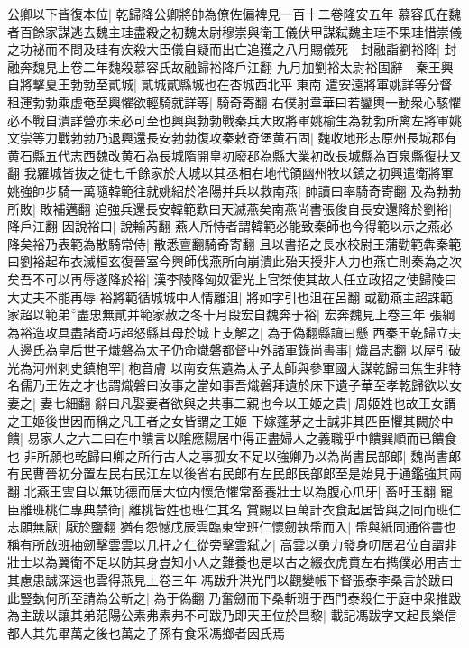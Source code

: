 公卿以下皆復本位|{
	乾歸降公卿將帥為僚佐偏裨見一百十二卷隆安五年}
慕容氏在魏者百餘家謀逃去魏主珪盡殺之初魏太尉穆崇與衛王儀伏甲謀弑魏主珪不果珪惜崇儀之功袐而不問及珪有疾殺大臣儀自疑而出亡追獲之八月賜儀死　封融詣劉裕降|{
	封融奔魏見上卷二年魏殺慕容氏故融歸裕降戶江翻}
九月加劉裕太尉裕固辭　秦王興自將擊夏王勃勃至貳城|{
	貳城貳縣城也在杏城西北平東南}
遣安遠將軍姚詳等分督租運勃勃乘虚奄至興懼欲輕騎就詳等|{
	騎奇寄翻}
右僕射韋華曰若鑾輿一動衆心駭懼必不戰自潰詳營亦未必可至也興與勃勃戰秦兵大敗將軍姚榆生為勃勃所禽左將軍姚文崇等力戰勃勃乃退興還長安勃勃復攻秦敕奇堡黄石固|{
	魏收地形志原州長城郡有黄石縣五代志西魏改黄石為長城隋開皇初廢郡為縣大業初改長城縣為百泉縣復扶又翻}
我羅城皆抜之徙七千餘家於大城以其丞相右地代領幽州牧以鎮之初興遣衛將軍姚強帥步騎一萬隨韓範往就姚紹於洛陽并兵以救南燕|{
	帥讀曰率騎奇寄翻}
及為勃勃所敗|{
	敗補邁翻}
追強兵還長安韓範歎曰天滅燕矣南燕尚書張俊自長安還降於劉裕|{
	降戶江翻}
因說裕曰|{
	說輸芮翻}
燕人所恃者謂韓範必能致秦師也今得範以示之燕必降矣裕乃表範為散騎常侍|{
	散悉亶翻騎奇寄翻}
且以書招之長水校尉王蒲勸範犇秦範曰劉裕起布衣滅桓玄復晉室今興師伐燕所向崩潰此殆天授非人力也燕亡則秦為之次矣吾不可以再辱遂降於裕|{
	漢李陵降匈奴霍光上官桀使其故人任立政招之使歸陵曰大丈夫不能再辱}
裕將範循城城中人情離沮|{
	將如字引也沮在呂翻}
或勸燕主超誅範家超以範弟盡忠無貳并範家赦之冬十月段宏自魏奔于裕|{
	宏奔魏見上卷三年}
張綱為裕造攻具盡諸奇巧超怒縣其母於城上支解之|{
	為于偽翻縣讀曰懸}
西秦王乾歸立夫人邊氏為皇后世子熾磐為太子仍命熾磐都督中外諸軍錄尚書事|{
	熾昌志翻}
以屋引破光為河州刺史鎮枹罕|{
	枹音膚}
以南安焦遺為太子太師與參軍國大謀乾歸曰焦生非特名儒乃王佐之才也謂熾磐曰汝事之當如事吾熾磐拜遺於床下遺子華至孝乾歸欲以女妻之|{
	妻七細翻}
辭曰凡娶妻者欲與之共事二親也今以王姬之貴|{
	周姬姓也故王女謂之王姬後世因而稱之凡王者之女皆謂之王姬}
下嫁蓬茅之士誠非其匹臣懼其闕於中饋|{
	易家人之六二曰在中饋言以隂應陽居中得正盡婦人之義職乎中饋巽順而已饋食也}
非所願也乾歸曰卿之所行古人之事孤女不足以強卿乃以為尚書民部郎|{
	魏尚書郎有民曹晉初分置左民右民江左以後省右民郎有左民郎民部郎至是始見于通鑑強其兩翻}
北燕王雲自以無功德而居大位内懷危懼常畜養壯士以為腹心爪牙|{
	畜吁玉翻}
寵臣離班桃仁專典禁衛|{
	離桃皆姓也班仁其名}
賞賜以巨萬計衣食起居皆與之同而班仁志願無厭|{
	厭於鹽翻}
猶有怨憾戊辰雲臨東堂班仁懷劒執帋而入|{
	帋與紙同通俗書也}
稱有所啟班抽劒擊雲雲以几扞之仁從旁擊雲弑之|{
	高雲以勇力發身叨居君位自謂非壯士以為翼衛不足以防其身豈知小人之難養也是以古之綴衣虎賁左右擕僕必用吉士其慮患誠深遠也雲得燕見上卷三年}
馮跋升洪光門以觀變帳下督張泰李桑言於跋曰此豎埶何所至請為公斬之|{
	為于偽翻}
乃奮劒而下桑斬班于西門泰殺仁于庭中衆推跋為主跋以讓其弟范陽公素弗素弗不可跋乃即天王位於昌黎|{
	載記馮跋字文起長樂信都人其先畢萬之後也萬之子孫有食采馮鄉者因氏焉}
